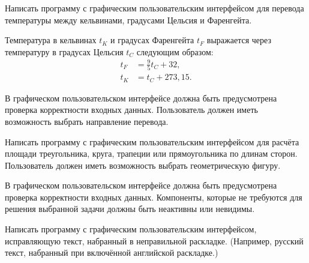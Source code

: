 \task Написать программу с графическим пользовательским интерфейсом
для перевода температуры между кельвинами, градусами Цельсия и
Фаренгейта.

Температура в кельвинах $t_K$ и градусах Фаренгейта $t_F$ выражается
через температуру в градусах Цельсия $t_C$ следующим образом:
\begin{align*}
  t_F &= \frac95 t_C + 32,\\
  t_K &= t_C + 273{,}15.
\end{align*}

В графическом пользовательском интерфейсе должна быть предусмотрена
проверка корректности входных данных. Пользователь должен иметь
возможность выбрать направление перевода.

\task Написать программу с графическим пользовательским интерфейсом
для расчёта площади треугольника, круга, трапеции или прямоугольника
по длинам сторон. Пользователь должен иметь возможность выбрать
геометрическую фигуру.

В графическом пользовательском интерфейсе должна быть предусмотрена
проверка корректности входных данных. Компоненты, которые не требуются
для решения выбранной задачи должны быть неактивны или невидимы.

\task Написать программу с графическим пользовательским интерфейсом,
исправляющую текст, набранный в неправильной раскладке. (Например,
русский текст, набранный при включённой английской раскладке.)

